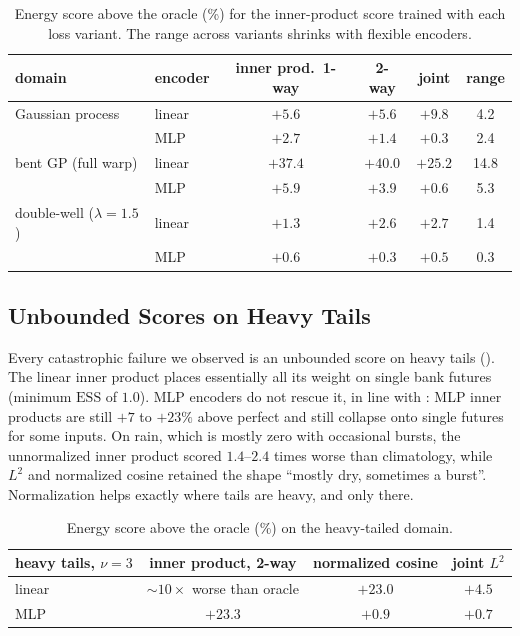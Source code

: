 \documentclass[11pt]{article}
\theoremstyle{plain}
\theoremstyle{definition}
\theoremstyle{remark}
\newcommand{\ESS}{\mathrm{ESS}}
\begin{document}
\begin{table}[ht]
 \centering
 \begin{tabular}{llcccc}
  \toprule
  domain                       & encoder & inner prod.\ 1-way & 2-way & joint & range \\
  \midrule
  Gaussian process             & linear  & $+5.6$  & $+5.6$  & $+9.8$  & 4.2  \\
                               & MLP     & $+2.7$  & $+1.4$  & $+0.3$  & 2.4  \\
  bent GP (full warp)          & linear  & $+37.4$ & $+40.0$ & $+25.2$ & 14.8 \\
                               & MLP     & $+5.9$  & $+3.9$  & $+0.6$  & 5.3  \\
  double-well ($\lambda=1.5$)  & linear  & $+1.3$  & $+2.6$  & $+2.7$  & 1.4  \\
                               & MLP     & $+0.6$  & $+0.3$  & $+0.5$  & 0.3  \\
  \bottomrule
 \end{tabular}
 \caption{Energy score above the oracle (\%) for the inner-product score
  trained with each loss variant. The range across variants shrinks with
  flexible encoders.}
 \label{tab:variants}
\end{table}

\subsection{Unbounded Scores on Heavy Tails}
\label{ssec:heavytails}

Every catastrophic failure we observed is an unbounded score on heavy tails
(). The linear inner product places essentially all its
weight on single bank futures (minimum $\ESS$ of $1.0$). MLP encoders do not
rescue it, in line with : MLP inner products are still $+7$
to $+23\%$ above perfect and still collapse onto single futures for some
inputs. On rain, which is mostly zero with occasional bursts, the
unnormalized inner product scored $1.4$--$2.4$ times worse than climatology,
while $L^2$ and normalized cosine retained the shape ``mostly dry, sometimes a
burst''. Normalization helps exactly where tails are heavy, and only there.

\begin{table}[ht]
 \centering
 \begin{tabular}{lccc}
  \toprule
  heavy tails, $\nu=3$ & inner product, 2-way             & normalized cosine & joint $L^2$ \\
  \midrule
  linear               & $\sim10\times$ worse than oracle & $+23.0$           & $+4.5$      \\
  MLP                  & $+23.3$                          & $+0.9$            & $+0.7$      \\
  \bottomrule
 \end{tabular}
 \caption{Energy score above the oracle (\%) on the heavy-tailed domain.}
 \label{tab:heavy}
\end{table}
\end{document}
